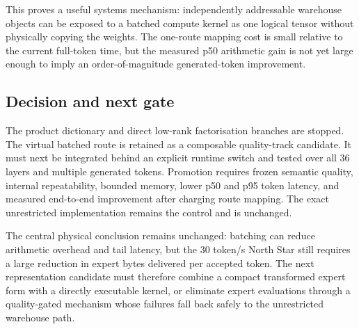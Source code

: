 This proves a useful systems mechanism: independently addressable warehouse
objects can be exposed to a batched compute kernel as one logical tensor without
physically copying the weights.  The one-route mapping cost is small relative
to the current full-token time, but the measured p50 arithmetic gain is not yet
large enough to imply an order-of-magnitude generated-token improvement.

\subsection{Decision and next gate}

The product dictionary and direct low-rank factorisation branches are stopped.
The virtual batched route is retained as a composable quality-track candidate.
It must next be integrated behind an explicit runtime switch and tested over
all 36 layers and multiple generated tokens.  Promotion requires frozen semantic
quality, internal repeatability, bounded memory, lower p50 and p95 token latency,
and measured end-to-end improvement after charging route mapping.  The exact
unrestricted implementation remains the control and is unchanged.

The central physical conclusion remains unchanged: batching can reduce
arithmetic overhead and tail latency, but the 30 token/s North Star still
requires a large reduction in expert bytes delivered per accepted token.  The
next representation candidate must therefore combine a compact transformed
expert form with a directly executable kernel, or eliminate expert evaluations
through a quality-gated mechanism whose failures fall back safely to the
unrestricted warehouse path.
